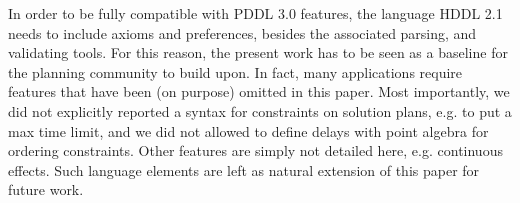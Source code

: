 \documentclass[letterpaper]{article} %
\begin{document}
In order to be fully compatible with PDDL 3.0 features, the language HDDL 2.1 needs to include axioms and preferences, besides the associated parsing, and validating tools. For this reason, the present work has to be seen as a baseline for the planning community to build upon.
In fact, many applications require features that have been (on purpose) omitted in this paper. Most importantly, we did not explicitly reported a syntax for constraints on solution plans, e.g. to put a max time limit, and we did not allowed to define delays  with point algebra for ordering constraints. Other features are simply not detailed here, e.g. continuous effects.
Such language elements are left as natural extension of this paper for future work.




\end{document}
